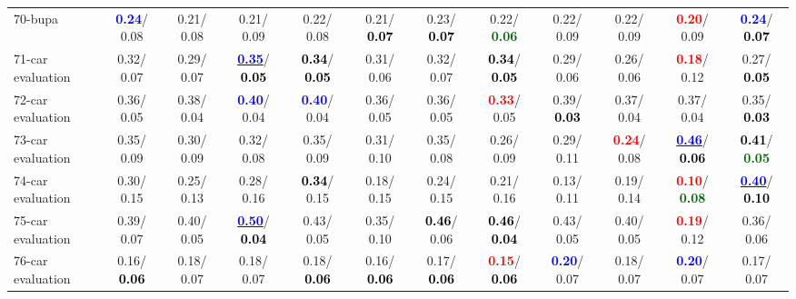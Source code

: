 \begin{table}[h]
\begin{center}
{\begin{tabular}{lc|c|c|c|c|c|c|c|c|c|c}
70-bupa & \textcolor{blue}{\textbf{  0.24}}/  0.08 &   0.21/  0.08 &   0.21/  0.09 &   0.22/  0.08 &   0.21/\textcolor{black}{\textbf{  0.07}} &   0.23/\textcolor{black}{\textbf{  0.07}} &   0.22/\textcolor{darkgreen}{\textbf{  0.06}} &   0.22/  0.09 &   0.22/  0.09 & \textcolor{red}{\textbf{  0.20}}/  0.09 & \textcolor{blue}{\textbf{  0.24}}/\textcolor{black}{\textbf{  0.07}} \\
71-car evaluation &   0.32/  0.07 &   0.29/  0.07 & \underline{\textcolor{blue}{\textbf{  0.35}}}/\textcolor{black}{\textbf{  0.05}} & \textcolor{black}{\textbf{  0.34}}/\textcolor{black}{\textbf{  0.05}} &   0.31/  0.06 &   0.32/  0.07 & \textcolor{black}{\textbf{  0.34}}/\textcolor{black}{\textbf{  0.05}} &   0.29/  0.06 &   0.26/  0.06 & \textcolor{red}{\textbf{  0.18}}/  0.12 &   0.27/\textcolor{black}{\textbf{  0.05}} \\ \hline
72-car evaluation &   0.36/  0.05 &   0.38/  0.04 & \textcolor{blue}{\textbf{  0.40}}/  0.04 & \textcolor{blue}{\textbf{  0.40}}/  0.04 &   0.36/  0.05 &   0.36/  0.05 & \textcolor{red}{\textbf{  0.33}}/  0.05 &   0.39/\textcolor{black}{\textbf{  0.03}} &   0.37/  0.04 &   0.37/  0.04 &   0.35/\textcolor{black}{\textbf{  0.03}} \\
73-car evaluation &   0.35/  0.09 &   0.30/  0.09 &   0.32/  0.08 &   0.35/  0.09 &   0.31/  0.10 &   0.35/  0.08 &   0.26/  0.09 &   0.29/  0.11 & \textcolor{red}{\textbf{  0.24}}/  0.08 & \underline{\textcolor{blue}{\textbf{  0.46}}}/\textcolor{black}{\textbf{  0.06}} & \textcolor{black}{\textbf{  0.41}}/\textcolor{darkgreen}{\textbf{  0.05}} \\
74-car evaluation &   0.30/  0.15 &   0.25/  0.13 &   0.28/  0.16 & \textcolor{black}{\textbf{  0.34}}/  0.15 &   0.18/  0.15 &   0.24/  0.15 &   0.21/  0.16 &   0.13/  0.11 &   0.19/  0.14 & \textcolor{red}{\textbf{  0.10}}/\textcolor{darkgreen}{\textbf{  0.08}} & \underline{\textcolor{blue}{\textbf{  0.40}}}/\textcolor{black}{\textbf{  0.10}} \\
75-car evaluation &   0.39/  0.07 &   0.40/  0.05 & \underline{\textcolor{blue}{\textbf{  0.50}}}/\textcolor{black}{\textbf{  0.04}} &   0.43/  0.05 &   0.35/  0.10 & \textcolor{black}{\textbf{  0.46}}/  0.06 & \textcolor{black}{\textbf{  0.46}}/\textcolor{black}{\textbf{  0.04}} &   0.43/  0.05 &   0.40/  0.05 & \textcolor{red}{\textbf{  0.19}}/  0.12 &   0.36/  0.06 \\
76-car evaluation &   0.16/\textcolor{black}{\textbf{  0.06}} &   0.18/  0.07 &   0.18/  0.07 &   0.18/\textcolor{black}{\textbf{  0.06}} &   0.16/\textcolor{black}{\textbf{  0.06}} &   0.17/\textcolor{black}{\textbf{  0.06}} & \textcolor{red}{\textbf{  0.15}}/\textcolor{black}{\textbf{  0.06}} & \textcolor{blue}{\textbf{  0.20}}/  0.07 &   0.18/  0.07 & \textcolor{blue}{\textbf{  0.20}}/  0.07 &   0.17/  0.07 \\

\end{tabular}}
\end{center}
\end{table}
